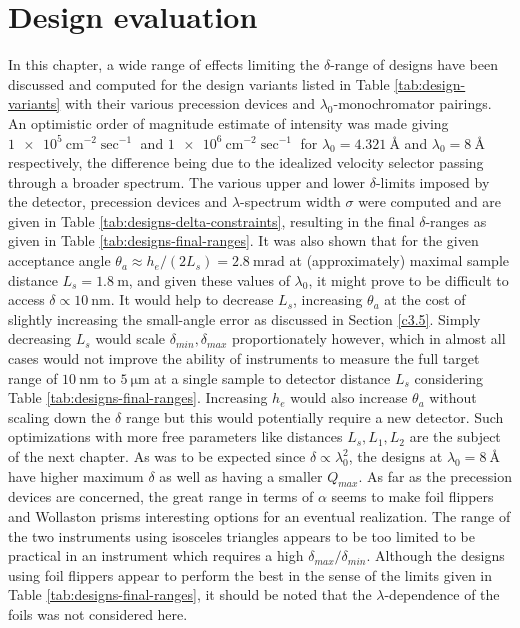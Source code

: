 \section{Design evaluation}
In this chapter, a wide range of effects limiting the $\delta$-range of designs have been discussed and computed for the design variants listed in Table \ref{tab:design-variants} with their various precession devices and $\lambda_0$-monochromator pairings. An optimistic order of magnitude estimate of intensity was made giving $\SI{1e5}{\centi\meter^{-2}\sec^{-1}}$ and $\SI{1e6}{\centi\meter^{-2}\sec^{-1}}$ for $\lambda_0 = \SI{4.321}{\angstrom}$ and $\lambda_0 = \SI{8}{\angstrom}$ respectively, the difference being due to the idealized velocity selector passing through a broader spectrum. The various upper and lower $\delta$-limits imposed by the detector, precession devices and $\lambda$-spectrum width $\sigma$ were computed and are given in Table \ref{tab:designs-delta-constraints}, resulting in the final $\delta$-ranges as given in Table \ref{tab:designs-final-ranges}. It was also shown that for the given acceptance angle $\theta_a \approx h_e / (2L_s) = \SI{2.8}{\milli\radian}$ at (approximately) maximal sample distance $L_s = \SI{1.8}{\meter}$, and given these values of $\lambda_0$, it might prove to be difficult to access $\delta\propto \SI{10}{\nano\meter}$. It would help to decrease $L_s$, increasing $\theta_a$ at the cost of slightly increasing the small-angle error as discussed in Section \ref{c3.5}. Simply decreasing $L_s$ would scale $\delta_{min}, \delta_{max}$ proportionately however, which in almost all cases would not improve the ability of instruments to measure the full target range of $\SI{10}{\nano\meter}$ to $\SI{5}{\micro\meter}$ at a single sample to detector distance $L_s$ considering Table \ref{tab:designs-final-ranges}. Increasing $h_e$ would also increase $\theta_a$ without scaling down the $\delta$ range but this would potentially require a new detector. Such optimizations with more free parameters like distances $L_s, L_1, L_2$ are the subject of the next chapter. As was to be expected since $\delta \propto \lambda_0^2$, the designs at $\lambda_0 = \SI{8}{\angstrom}$ have higher maximum $\delta$ as well as having a smaller $Q_{max}$. As far as the precession devices are concerned, the great range in terms of $\alpha$ seems to make foil flippers and Wollaston prisms interesting options for an eventual realization. The range of the two instruments using isosceles triangles appears to be too limited to be practical in an instrument which requires a high $\delta_{max}/\delta_{min}$. Although the designs using foil flippers appear to perform the best in the sense of the limits given in Table \ref{tab:designs-final-ranges}, it should be noted that the $\lambda$-dependence \cite{kraan2003} of the foils was not considered here.